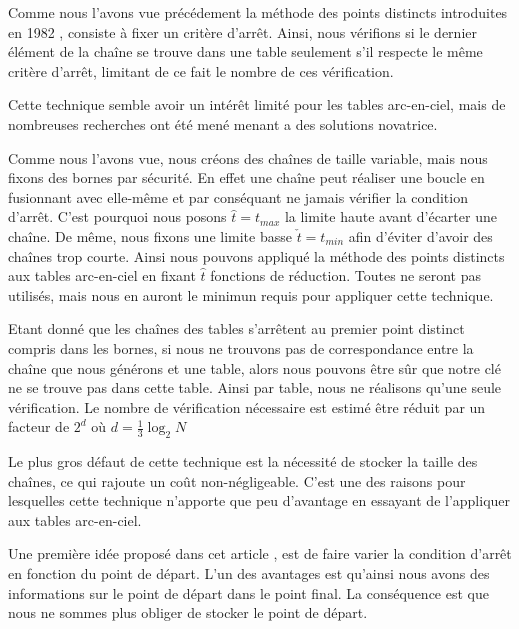 	Comme nous l'avons vue précédement la méthode des points distincts introduites en 1982 \cite{Rivest}, consiste à fixer un critère d'arrêt. Ainsi, nous vérifions si le dernier élément de la chaîne se trouve dans une table seulement s'il respecte le même critère d'arrêt, limitant de ce fait le nombre de ces vérification.

	\bigskip

	Cette technique semble avoir un intérêt limité pour les tables arc-en-ciel, mais de nombreuses recherches ont été mené menant a des solutions novatrice.

	\bigskip


		Comme nous l'avons vue, nous créons des chaînes de taille variable, mais nous fixons des bornes par sécurité. En effet une chaîne peut réaliser une boucle en fusionnant avec elle-même et par conséquant ne jamais vérifier la condition d'arrêt. C'est pourquoi nous posons $\hat{t}=t_{max}$ la limite haute avant d'écarter une chaîne. De même, nous fixons une limite basse $\check{t}=t_{min}$ afin d'éviter d'avoir des chaînes trop courte. Ainsi nous pouvons appliqué la méthode des points distincts aux tables arc-en-ciel en fixant $\hat{t}$ fonctions de réduction. Toutes ne seront pas utilisés, mais nous en auront le minimun requis pour appliquer cette technique.

		\bigskip

		Etant donné que les chaînes des tables s'arrêtent au premier point distinct compris dans les bornes, si nous ne trouvons pas de correspondance entre la chaîne que nous générons et une table, alors nous pouvons être sûr que notre clé ne se trouve pas dans cette table. Ainsi par table, nous ne réalisons qu'une seule vérification. Le nombre de vérification nécessaire est estimé être réduit par un facteur de $2^d$ où $d=\frac{1}{3}\log_2 N$

		\bigskip

		Le plus gros défaut de cette technique est la nécessité de stocker la taille des chaînes, ce qui rajoute un coût non-négligeable. C'est une des raisons pour lesquelles cette technique n'apporte que peu d'avantage en essayant de l'appliquer aux tables arc-en-ciel.

		\bigskip


		Une première idée proposé dans cet article \cite{VDP}, est de faire varier la condition d'arrêt en fonction du point de départ. L'un des avantages est qu'ainsi nous avons des informations sur le point de départ dans le point final. La conséquence est que nous ne sommes plus obliger de stocker le point de départ.

